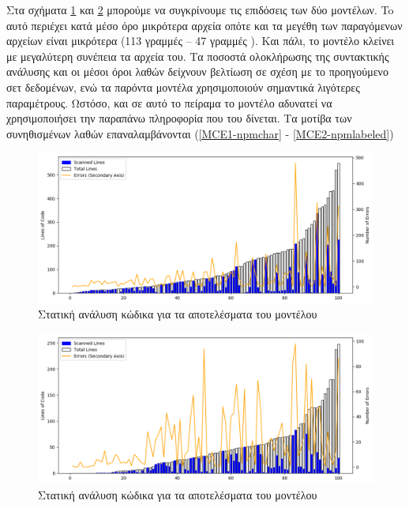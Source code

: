 

\pagebreak



Στα σχήματα \ref{static-npm-char} και \ref{static-npm-labeled} μπορούμε να συγκρίνουμε τις επιδόσεις των δύο μοντέλων.
To  αυτό περιέχει κατά μέσο όρο μικρότερα αρχεία οπότε και τα μεγέθη των παραγόμενων αρχείων είναι μικρότερα (113 γραμμές  -- 47 γραμμές ). 
Και πάλι, το  μοντέλο κλείνει με μεγαλύτερη συνέπεια τα αρχεία του.
Τα ποσοστά ολοκλήρωσης της συντακτικής ανάλυσης και οι μέσοι όροι λαθών δείχνουν βελτίωση σε σχέση με το προηγούμενο σετ δεδομένων, ενώ τα παρόντα μοντέλα χρησιμοποιούν σημαντικά λιγότερες παραμέτρους.
Ωστόσο, και σε αυτό το πείραμα το  μοντέλο αδυνατεί να χρησιμοποιήσει την παραπάνω πληροφορία που του δίνεται. Τα μοτίβα των συνηθισμένων λαθών επαναλαμβάνονται (\ref{MCE1-npmchar} - \ref{MCE2-npmlabeled})

\begin{figure}
	\includegraphics[width=\textwidth, keepaspectratio]{images/jshint-npmchar.png}
	\caption{Στατική ανάλυση κώδικα για τα αποτελέσματα του  μοντέλου}
	\label{static-npm-char}
\end{figure}

\begin{figure}
	\includegraphics[width=\textwidth, keepaspectratio]{images/jshint-npmlabeled.png}
	\caption{Στατική ανάλυση κώδικα για τα αποτελέσματα του  μοντέλου}
	\label{static-npm-labeled}
\end{figure}

